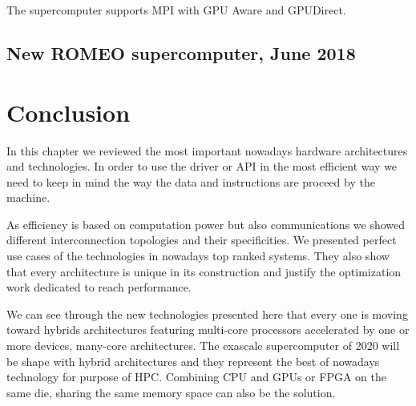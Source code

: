 The supercomputer supports MPI with GPU Aware and GPUDirect. 

\subsection{New ROMEO supercomputer, June 2018}


\section{Conclusion}

In this chapter we reviewed the most important nowadays hardware architectures and technologies. 
In order to use the driver or API in the most efficient way we need to keep in mind the way the data and instructions are proceed by the machine. 

As efficiency is based on computation power but also communications we showed different interconnection topologies and their specificities. 
We presented perfect use cases of the technologies in nowadays top ranked systems.
They also show that every architecture is unique in its construction and justify the optimization work dedicated to reach performance. 

We can see through the new technologies presented here that every one is moving toward hybrids architectures featuring multi-core processors accelerated by one or more devices, many-core architectures. 
The exascale supercomputer of 2020 will be shape with hybrid architectures and they represent the best of nowadays technology for purpose of HPC. 
Combining CPU and GPUs or FPGA on the same die, sharing the same memory space can also be the solution.
